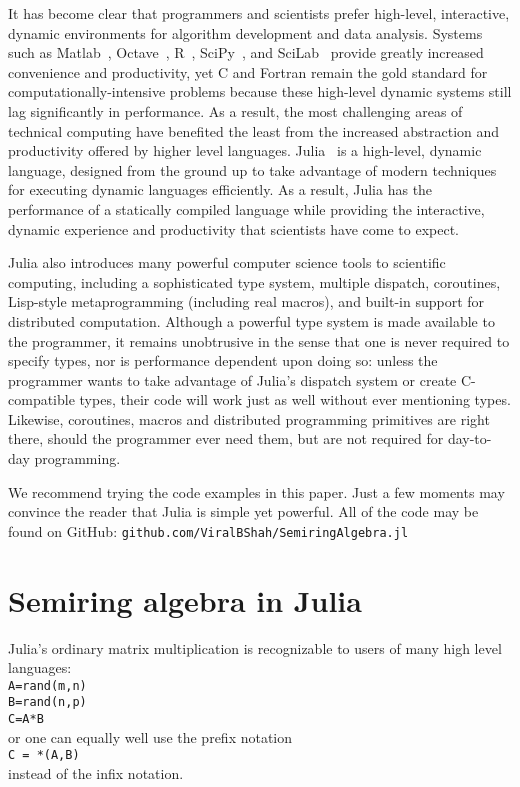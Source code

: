 \documentclass[conference]{IEEEtran}
\begin{document}
It has become clear that programmers and scientists prefer high-level, interactive, dynamic environments for algorithm development and data analysis.
Systems such as Matlab~\cite{matlab}, Octave~\cite{Octave}, R~\cite{Rlang}, SciPy~\cite{numpy}, and SciLab~\cite{scilab} provide greatly increased convenience and productivity, yet C and Fortran remain the gold standard for computationally-intensive problems because these high-level dynamic systems still lag significantly in performance.
As a result, the most challenging areas of technical computing have benefited the least from the increased abstraction and productivity offered by higher level languages.
Julia~\cite{julia} is a high-level, dynamic language, designed from the ground up to take advantage of modern techniques for executing dynamic languages efficiently.
As a result, Julia has the performance of a statically compiled language while providing the interactive, dynamic experience and productivity that scientists have come to expect.

Julia also introduces many powerful computer science tools to scientific computing, including a sophisticated type system, multiple dispatch, coroutines, Lisp-style metaprogramming (including real macros), and built-in support for distributed computation.
Although a powerful type system is made available to the programmer, it remains unobtrusive in the sense that one is never required to specify types, nor is performance dependent upon doing so:
unless the programmer wants to take advantage of Julia's dispatch system or create C-compatible types, their code will work just as well without ever mentioning types.
Likewise, coroutines, macros and distributed programming primitives are right there, should the programmer ever need them, but are not required for day-to-day programming.

We recommend trying the code examples in this paper.
Just a few moments may convince the reader that Julia is simple yet powerful.
All of the code may be found on GitHub:
{\tt github.com/ViralBShah/SemiringAlgebra.jl}

\section{Semiring algebra in Julia}

Julia's ordinary matrix multiplication is recognizable to users of many
high level languages: \\
{\tt A=rand(m,n) \\  B=rand(n,p) \\ C=A*B } \\
or one can equally well use the prefix notation \\
{\tt C = *(A,B)} \\
instead of the infix notation.
\end{document}
